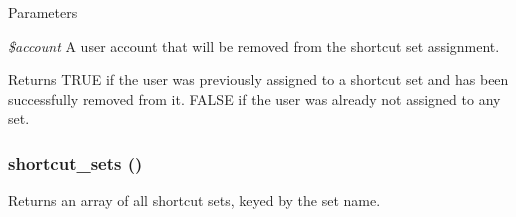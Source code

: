 \begin{DoxyParams}{Parameters}
\item[{\em \$account}]A user account that will be removed from the shortcut set assignment.\end{DoxyParams}
\begin{DoxyReturn}{Returns}
TRUE if the user was previously assigned to a shortcut set and has been successfully removed from it. FALSE if the user was already not assigned to any set. 
\end{DoxyReturn}
\hypertarget{shortcut_8module_a002474cc2439616432838649c8639983}{
\subsubsection[{shortcut\_\-sets}]{\setlength{\rightskip}{0pt plus 5cm}shortcut\_\-sets ()}}
\label{shortcut_8module_a002474cc2439616432838649c8639983}
Returns an array of all shortcut sets, keyed by the set name.

